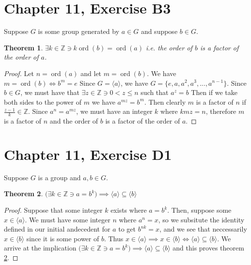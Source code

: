 \documentclass[12pt]{article}
\newcommand{\ints}{\mathbb{Z}}
\newcommand{\ord}{\operatorname{ord}}
\newtheorem{thm}{Theorem}
\begin{document}
\section{Chapter 11, Exercise B3}

Suppose $G$ is some group generated by $a \in G$
and suppose $b \in G$.

\begin{thm} \label{thm2}
	$\exists k \in \ints \ni k\ord(b) = \ord(a)$
	i.e. the order of $b$ is a factor of the order of $a$.
\end{thm}

\begin{proof}
	Let $n = \ord(a)$ and let $m = \ord(b)$.
	We have $m = \ord(b) \iff b^m = e$
	Since $G = \langle a \rangle$,
	we have $G = \{e, a, a^2, a^3, ..., a^{n-1} \}$.
	Since $b \in G$, we must have that
	$\exists z \in \ints \ni 0 < z \le n$
	such that $a^z = b$
	Then if we take both sides to the power of $m$
	we have $a^{mz} = b^m$.
	Then clearly $m$ is a factor of $n$
	if $\frac{z - 1}{k} \in \ints$.
	Since $a^n = a^{mz}$,
	we must have an integer $k$ where
	$kmz = n$,
	therefore $m$ is a factor of $n$
	and the order of $b$ is a factor of the order of $a$.
\end{proof}

\section{Chapter 11, Exercise D1}

Suppose $G$ is a group and $a,b \in G$.

\begin{thm} \label{thm3}
	$\Big(\exists k \in \ints \ni a = b^k \Big) \implies
	\langle a \rangle \subseteq \langle b \rangle$
\end{thm}

\begin{proof}
	Suppose that some integer $k$ exists
	where $a = b^k$.
	Then, suppose some $x \in \langle a \rangle$.
	We must have some integer $n$ where $a^n = x$,
	so we subsitute the identity defined in our
	initial andecedent for $a$ to get $b^{nk} = x$,
	and we see that neccessarily $x \in \langle b \rangle$
	since it is some power of $b$.
	Thus $x \in \langle a \rangle \implies x \in \langle b \rangle
	\iff \langle a \rangle \subseteq \langle b \rangle$.
	We arrive at the implication
	$\Big(\exists k \in \ints \ni a = b^k \Big) \implies
	\langle a \rangle \subseteq \langle b \rangle$
	and this proves theorem \ref{thm3}.
\end{proof}
\end{document}
